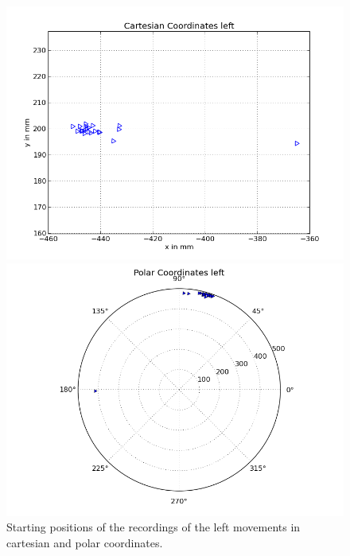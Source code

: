 \documentclass{scrartcl}
\begin{document}
\begin{figure}[H]
\centering
\begin{minipage}{.5\textwidth}
  \centering
  \includegraphics[width=.8\linewidth]{img/left_s.png}
\end{minipage}%
\begin{minipage}{.5\textwidth}
  \centering
  \includegraphics[width=.8\linewidth]{img/left_pc_s.png}
\end{minipage}
\caption{Starting positions of the recordings of the left movements in cartesian and polar coordinates.}
\label{fig:left_s}
\end{figure}
\end{document}
